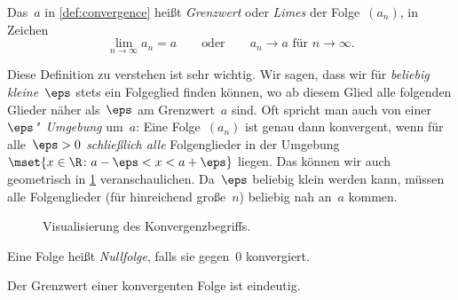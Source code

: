 \documentclass[a4paper]{article}
\begin{document}
\begin{definition}
    Das~$a$ in \cref{def:convergence} heißt \emph{Grenzwert} oder \emph{Limes} der Folge~$(a_n)$, in Zeichen
    \begin{equation*}
        \lim_{n\to\infty} a_n = a \qquad\text{oder}\qquad a_n \to a \text{ für } n \to \infty.
    \end{equation*}
\end{definition}

Diese Definition zu verstehen ist sehr wichtig. Wir sagen, dass wir für \emph{beliebig kleine}~$\eps$ stets ein Folgeglied finden können, wo ab diesem Glied alle folgenden Glieder näher als~$\eps$ am Grenzwert~$a$ sind. Oft spricht man auch von einer \emph{$\eps$"~Umgebung} um~$a$: Eine Folge~$(a_n)$ ist genau dann konvergent, wenn für alle~$\eps > 0$ \emph{schließlich alle} Folgenglieder in der Umgebung $\mset{x \in \R\colon a-\eps < x < a+\eps}$ liegen. Das können wir auch geometrisch in \cref{fig:convergence} veranschaulichen. Da~$\eps$ beliebig klein werden kann, müssen alle Folgenglieder (für hinreichend große~$n$) beliebig nah an~$a$ kommen.

\begin{figure}
    \caption{Visualisierung des Konvergenzbegriffs.}\label{fig:convergence}
\end{figure}

\begin{definition}[Nullfolge]
    Eine Folge heißt \emph{Nullfolge}, falls sie gegen~0 konvergiert.
\end{definition}

\begin{theorem}
    Der Grenzwert einer konvergenten Folge ist eindeutig.
\end{theorem}
\end{document}
